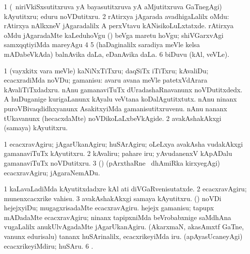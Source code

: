 {\noindent 
\gl{\pagu}
\expl{}
\bmng
\bnum
\num{1}  (\sA\ niriVkiSxsutitxruva yA bayasutitxruva yA aMjutitxruva GaTnegAgi) kAyutitxru; eduru noVDutitxru. 
\num{2}  rAtirxya jAgarada avadhigaLalilx oMdu:  rAtirxya nAlkxneV jAgaradalilx A perxVtavu kANisikoLuLxtatxde. 
  
\banum
{} rAtirxya oMdu jAgaradaMte kaLeduhoVgu 
 (\rUpa) beVga maretu hoVgu; shiVGarxvAgi samxqqtiyiMda mareyAgu 
\eanum
\numie
\num{4}  
\num{5}  (haDaginalilx saradiya meVle kelsa mADabeVkAda) balnAvika daLa, eDanAvika daLa. 
\num{6}  biDuvu (kAl, veVLe). 
\enum
\emng
\eentry

\bentry
{} 
\gl{\sakirx}
\expl{}
\bmng
\bnum
\num{1} (vayxkitx \mo vara meVle) kaNiNxTiTxru; daqSiTx iTiTxru; kAvaliDu; ecacxradiMda noVDu; gamanisu:  avaru avana meVle patetxVdArara kAvaliTiTxdadxru.  nAnu gamanaviTuTx dUradashaRnavanunx noVDutitxdedx.  A huDuganige kurigaLanunx kAyalu veVtana koDalAgutitxtutx.  nAnu ninanx puroVBivaqdidhxyanunx AsakitxyiMda gamanisutitxruvenu.  nAnu nananx tUkavanunx (hecacxdaMte) noVDikoLaLxbeVkAgide. 
\num{2} avakAshakAkxgi (samaya) kAyutitxru. 
\enum
\emng

\noindent 
\gl{\akirx}
\expl{}
\bmng
\bnum
\num{1} ecacxravAgiru; jAgarUkanAgiru; huSArAgiru; oLeLxya avakAsha \mo vudakAkxgi gamanaviTuTx kAyutitxru. 
\num{2} kAvaliru; pahare iru; yAvudanenxV kApADalu gamanaviTuTx noVDutitxru. 
\num{3} (\pArxparx) (pArxthaRne \mo\ dhAmiRka kirxyegAgi) ecacxravAgiru; jAgaraNemADu. 
\enum
\emng

\noindent 
\gl{\pagu}
\expl{}
\bmng
\bnum
\num{1}  kaLavaLadiMda kAyutitxdadxre kAl ati diVGaRvenisutatxde. 
\num{2}  ecacxravAgiru; munenxcacxrike vahisu. 
\num{3} avakAshakAkxgi samaya kAyutitxru. \eng{} 
  (\AmA) 
\banum
{} noVDi hejejxyiDu; mugagxrisadaMte ecacxravAgiru. 
 hejejx gamanisu; tapupx mADadaMte ecacxravAgiru; ninanx tapipxniMda beVrobabxnige saMdhAna \mo vugaLalilx anukUlvAgadaMte jAgarUkanAgiru. 
\eanum
\numie
{}  
\banum
{} (AkarxmaN, akasAmxtf GaTne, \mo vanunx edurisalu) tananx huSArinalilx, ecacxrikeyiMda iru. 
 (apAyasUcaneyAgi) ecacxrikeyiMdiru; huSAru. 
\eanum
\numie
\num{6} . 
\enum
\emng
\eentry

}
